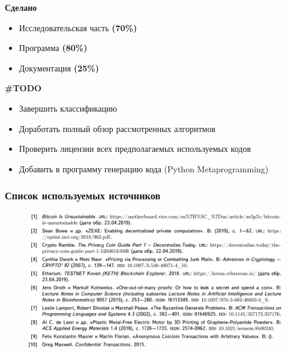 \documentclass{beamer}
\begin{document}
\begin{frame}
    \begin{multicols}{2}
        \begin{center}
            \textbf{Сделано}
        \end{center}
        \begin{itemize}
            \item Исследовательская часть {\bfseries \color{yellow!60!green}(70\%)}
            \item Программа {\bfseries \color{green!75!blue}(80\%)}
            \item Документация {\bfseries \color{red!75!blue}(25\%)}
        \end{itemize}
        \bigskip
        \columnbreak
        \begin{center}
            \textbf{\#TODO}
        \end{center}
        \begin{itemize}
            \item Завершить классификацию
            \item Доработать полный обзор рассмотренных алгоритмов
            \item Проверить лицензии всех предполагаемых используемых кодов
            \item Добавить в программу генерацию кода (Python Metaprogramming)
        \end{itemize}
    \end{multicols}
\end{frame}

\begin{frame}
    \frametitle{Список используемых источников}
    \begin{figure}
        \includegraphics[width=\columnwidth]{lit1.png}
    \end{figure}
\end{frame}
\end{document}
